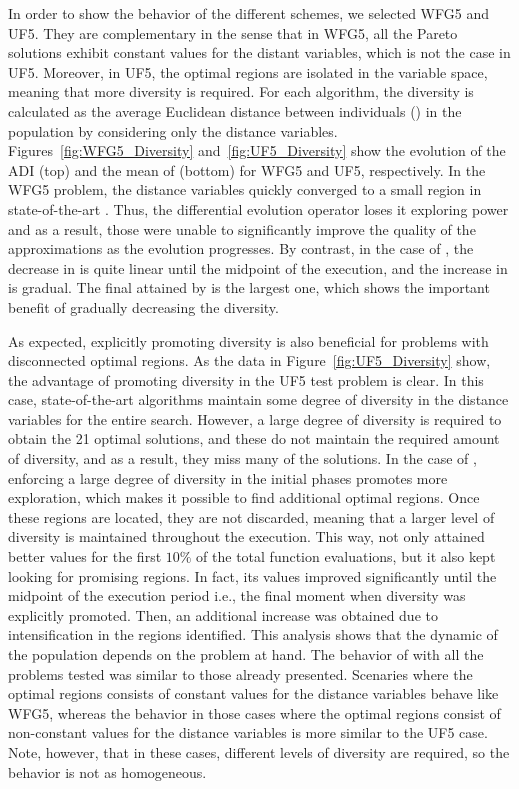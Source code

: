 In order to show the behavior of the different schemes, we selected WFG5 and UF5.
%
They are complementary in the sense that in WFG5, all the Pareto solutions exhibit constant 
values for the distant variables, which is not the case in UF5.
%
Moreover, in UF5, the optimal regions are isolated in the variable 
space, meaning that more diversity is required.
%
For each algorithm, the diversity is calculated as the average Euclidean distance between individuals (\ADI{}) in the population 
by considering only the distance variables.
%
Figures~\ref{fig:WFG5_Diversity} and~\ref{fig:UF5_Diversity} show the evolution of the ADI (top) and the mean of \HV{} (bottom) 
for WFG5 and UF5, respectively.
%
In the WFG5 problem, the distance variables quickly converged to a small region 
in state-of-the-art \MOEAS{}.
%
Thus, the differential evolution operator loses it exploring power and as a result,
those \MOEAS{} were unable to significantly improve the quality of the approximations as the
evolution progresses.
%
By contrast, in the case of \AVSDMOEAD{}, the decrease in \ADI{} is quite linear until the midpoint of the execution, and
the increase in \HV{} is gradual.
%
The final \HV{} attained by \AVSDMOEAD{} is the largest one, which shows the important benefit
of gradually decreasing the diversity.

As expected, explicitly promoting diversity is also beneficial for problems with disconnected optimal regions.
%
As the data in Figure~\ref{fig:UF5_Diversity} show, the advantage of promoting diversity in the UF5 test 
problem is clear.
%
In this case, state-of-the-art algorithms maintain some degree of diversity in the distance variables for
the entire search.
%
However, a large degree of diversity is required to obtain the 21 optimal solutions, and these \MOEAS{} do not maintain
the required amount of diversity, and as a result, they miss many of the solutions.
%
In the case of \AVSDMOEAD{}, enforcing a large degree of diversity in the initial phases promotes more exploration, 
which makes it possible to find additional optimal regions.
%
Once these regions are located, they are not discarded, meaning that a larger level of diversity is maintained throughout the
execution.
%
This way, \AVSDMOEAD{} not only attained better \HV{} values for the first $10\%$ of the total function evaluations, but 
it also kept looking for promising regions.
%
In fact, its \HV{} values improved significantly until the midpoint of the execution period i.e., the final moment
when diversity was explicitly promoted.
%
Then, an additional increase was obtained due to intensification in the regions identified.
%
This analysis shows that the dynamic of the population depends on the problem at hand.
%
The behavior of \AVSDMOEAD{} with all the problems tested
was similar to those already presented.
%
Scenaries where the optimal regions consists of constant values for the distance variables behave like WFG5, whereas
the behavior in those cases where the optimal regions consist of non-constant values for the distance variables is
more similar to the UF5 case.
%
Note, however, that in these cases, different levels of diversity are required, so the behavior is not as homogeneous.

